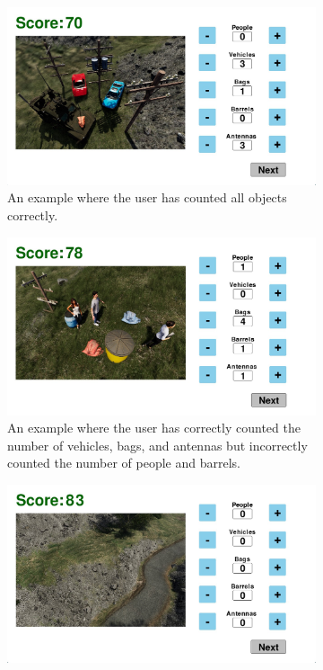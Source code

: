 \documentclass[preprint,12pt, a4paper]{elsarticle}
\begin{document}
\begin{figure}[!h]
        \centering
        \begin{subfigure}{0.71\linewidth}
            \centering
            \includegraphics[width=0.96\linewidth]{Figures/exA.jpg}
            \caption{An example where the user has counted all objects correctly.}
            \label{fig:examplesA}
        \end{subfigure}
        \begin{subfigure}{0.71\linewidth}
            \centering
            \includegraphics[width=0.96\linewidth]{Figures/exB.jpg}
            \caption{An example where the user has correctly counted the number of vehicles, bags, and antennas but incorrectly counted the number of people and barrels.}
            \label{fig:examplesB}
        \end{subfigure}
        \begin{subfigure}{0.71\linewidth}
            \centering
            \includegraphics[width=0.96\linewidth]{Figures/exC.jpg}

\end{subfigure}
\end{figure}
\end{document}
